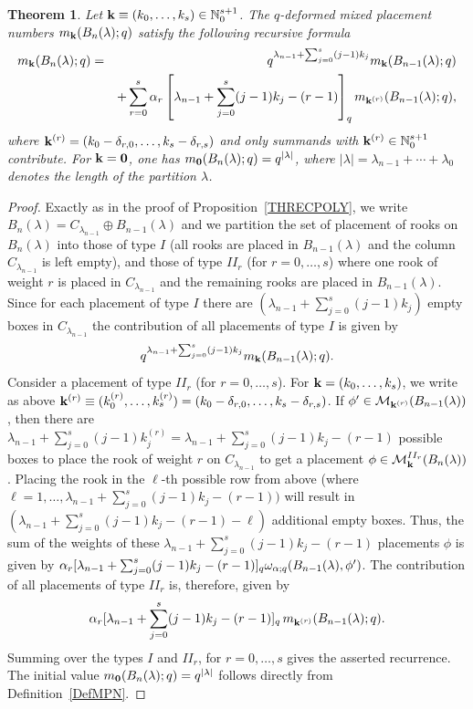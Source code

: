 \documentclass[10pt]{amsart}
\newtheorem{theorem}{Theorem}[section]%
\begin{document}
\begin{theorem}\label{RecurrenceMain}
Let ${\bf k}\equiv (k_0,\ldots,k_s)\in \mathbb{N}_0^{s+1}$. The $q$-deformed mixed placement numbers $m_{{\bf k}}(B_n(\lambda);q)$ satisfy the following recursive formula 
\begin{eqnarray*}
m_{{\bf k}}(B_n(\lambda);q) &=& q^{\lambda_{n-1}+\sum_{j=0}^s (j-1)k_j}m_{{\bf k}}(B_{n-1}(\lambda);q)\\ && +\sum_{r=0}^s \alpha_r \left[\lambda_{n-1}+\sum_{j=0}^s(j-1)k_{j}-(r-1) \right]_q m_{{\bf k}^{(r)}}(B_{n-1}(\lambda);q),
\end{eqnarray*}
where ${\bf k}^{(r)}=(k_0-\delta_{r,0},\ldots,k_{s}-\delta_{r,s})$ and only summands with ${\bf k}^{(r)}\in \mathbb{N}_0^{s+1}$ contribute. For ${\bf k}={\bf 0}$, one has $m_{{\bf 0}}(B_n(\lambda);q)=q^{|\lambda|}$, where $|\lambda|=\lambda_{n-1}+\cdots+\lambda_{0}$ denotes the length of the partition $\lambda$.
\end{theorem}
\begin{proof} 
Exactly as in the proof of Proposition~\ref{THRECPOLY}, we write $B_n(\lambda)=C_{\lambda_{n-1}}\oplus B_{n-1}(\lambda)$ and we partition the set of placement of rooks on $B_n(\lambda)$ into those of type $I$ (all rooks are placed in $B_{n-1}(\lambda)$ and the column $C_{\lambda_{n-1}}$ is left empty), and those of type $II_r$ (for $r=0,\ldots,s$) where one rook of weight $r$ is placed in $C_{\lambda_{n-1}}$ and the remaining rooks are placed in $B_{n-1}(\lambda)$. Since for each placement of type $I$ there are $(\lambda_{n-1}+\sum_{j=0}^s (j-1)k_j)$ empty boxes in $C_{\lambda_{n-1}}$ the contribution of all placements of type $I$ is given by 
$$
q^{\lambda_{n-1}+\sum_{j=0}^s (j-1)k_j}m_{{\bf k}}(B_{n-1}(\lambda);q).
$$
Consider a placement of type $II_r$ (for $r=0,\ldots,s$). For ${\bf k}=(k_0,\ldots,k_s)$, we write as above ${\bf k}^{(r)}\equiv (k_0^{(r)},\ldots,k_{s}^{(r)})=(k_0-\delta_{r,0},\ldots,k_{s}-\delta_{r,s})$. If $\phi' \in \mathcal{M}_{{\bf k}^{(r)}}(B_{n-1}(\lambda))$, then there are $\lambda_{n-1}+\sum_{j=0}^s(j-1)k_{j}^{(r)}= \lambda_{n-1}+\sum_{j=0}^s(j-1)k_{j}-(r-1)$ possible boxes to place the rook of weight $r$ on $C_{\lambda_{n-1}}$ to get a placement $\phi \in \mathcal{M}_{{\bf k}}^{II_r}(B_{n}(\lambda))$. Placing the rook in the $\ell$-th possible row from above (where $\ell=1,\ldots, \lambda_{n-1}+\sum_{j=0}^s(j-1)k_{j}-(r-1))$ will result in $(\lambda_{n-1}+\sum_{j=0}^s(j-1)k_{j}-(r-1)-\ell)$ additional empty boxes. Thus, the sum of the weights of these $\lambda_{n-1}+\sum_{j=0}^s(j-1)k_{j}-(r-1)$ placements $\phi$ is given by $\alpha_r [\lambda_{n-1}+\sum_{j=0}^s(j-1)k_{j}-(r-1)]_q \omega_{{\bf \alpha};q}(B_{n-1}(\lambda),\phi')$. The contribution of all placements of type $II_r$ is, therefore, given by
$$
\alpha_r [\lambda_{n-1}+\sum_{j=0}^s(j-1)k_{j}-(r-1)]_q \, m_{{\bf k}^{(r)}}(B_{n-1}(\lambda);q).
$$
Summing over the types $I$ and $II_r$, for $r=0,\ldots,s$ gives the asserted recurrence. The initial value $m_{{\bf 0}}(B_n(\lambda);q)=q^{|\lambda|}$ follows directly from Definition~\ref{DefMPN}.
\end{proof}
\end{document}
